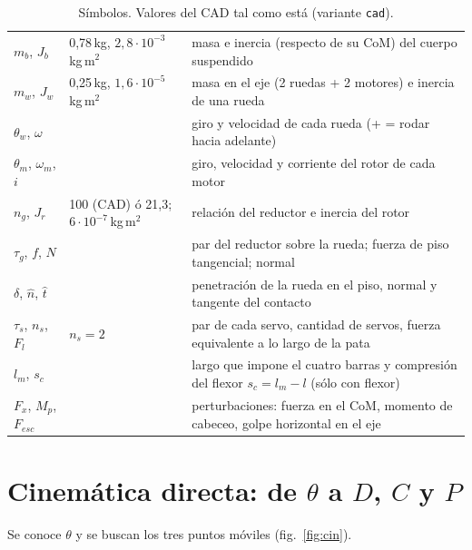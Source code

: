 \documentclass[11pt,a4paper]{article}
\newcommand{\code}[1]{\texttt{#1}}
\begin{document}
\begin{table}[H]
\begin{tabular}{llp{8.6cm}}
    $m_b$, $J_b$ & 0{,}78\,kg, $2{,}8\cdot10^{-3}$\,kg\,m$^2$ & masa e inercia (respecto de su CoM) del cuerpo suspendido \\
    $m_w$, $J_w$ & 0{,}25\,kg, $1{,}6\cdot10^{-5}$\,kg\,m$^2$ & masa en el eje (2 ruedas + 2 motores) e inercia de una rueda \\
    $\theta_w$, $\omega$ & & giro y velocidad de cada rueda (+ = rodar hacia adelante) \\
    $\theta_m$, $\omega_m$, $i$ & & giro, velocidad y corriente del rotor de cada motor \\
    $n_g$, $J_r$ & 100 (CAD) ó 21{,}3; $6\cdot10^{-7}$\,kg\,m$^2$ & relación del reductor e inercia del rotor \\
    $\tau_g$, $f$, $N$ & & par del reductor sobre la rueda; fuerza de piso tangencial; normal \\
    $\delta$, $\hat n$, $\hat t$ & & penetración de la rueda en el piso, normal y tangente del contacto \\
    $\tau_s$, $n_s$, $F_l$ & $n_s = 2$ & par de cada servo, cantidad de servos, fuerza equivalente a lo largo de la pata \\
    $l_m$, $s_c$ & & largo que impone el cuatro barras y compresión del flexor $s_c = l_m - l$ (sólo con flexor) \\
    $F_x$, $M_p$, $F_{esc}$ & & perturbaciones: fuerza en el CoM, momento de cabeceo, golpe horizontal en el eje \\
    \bottomrule
  \end{tabular}
  \caption{Símbolos. Valores del CAD tal como está (variante \code{cad}).}
  \label{tab:simb}
\end{table}

\section{Cinemática directa: de $\theta$ a $D$, $C$ y $P$}

Se conoce $\theta$ y se buscan los tres puntos móviles (fig.~\ref{fig:cin}).
\end{document}
